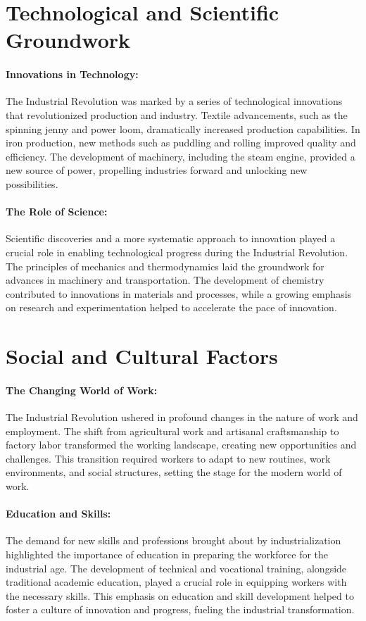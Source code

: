\documentclass{book}
\begin{document}
\section*{Technological and Scientific Groundwork}

\paragraph{Innovations in Technology:}
The Industrial Revolution was marked by a series of technological innovations that revolutionized production and industry. Textile advancements, such as the spinning jenny and power loom, dramatically increased production capabilities. In iron production, new methods such as puddling and rolling improved quality and efficiency. The development of machinery, including the steam engine, provided a new source of power, propelling industries forward and unlocking new possibilities.

\paragraph{The Role of Science:}
Scientific discoveries and a more systematic approach to innovation played a crucial role in enabling technological progress during the Industrial Revolution. The principles of mechanics and thermodynamics laid the groundwork for advances in machinery and transportation. The development of chemistry contributed to innovations in materials and processes, while a growing emphasis on research and experimentation helped to accelerate the pace of innovation.

\section*{Social and Cultural Factors}

\paragraph{The Changing World of Work:}
The Industrial Revolution ushered in profound changes in the nature of work and employment. The shift from agricultural work and artisanal craftsmanship to factory labor transformed the working landscape, creating new opportunities and challenges. This transition required workers to adapt to new routines, work environments, and social structures, setting the stage for the modern world of work.

\paragraph{Education and Skills:}
The demand for new skills and professions brought about by industrialization highlighted the importance of education in preparing the workforce for the industrial age. The development of technical and vocational training, alongside traditional academic education, played a crucial role in equipping workers with the necessary skills. This emphasis on education and skill development helped to foster a culture of innovation and progress, fueling the industrial transformation.
\end{document}
